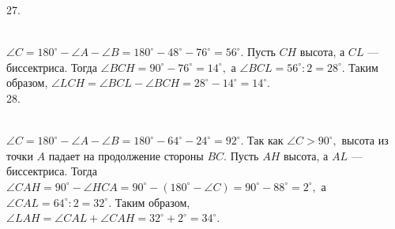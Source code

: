 \documentclass[12pt]{article}
\begin{document}
27. \begin{figure}[ht!]
\end{figure}\\
$\angle C=180^\circ-\angle A-\angle B=180^\circ-48^\circ-76^\circ=56^\circ.$ Пусть $CH$ высота, а $CL$ --- биссектриса. Тогда $\angle BCH=90^\circ-76^\circ=14^\circ,$ а $\angle BCL=56^\circ:2=28^\circ.$ Таким образом, $\angle LCH=\angle BCL- \angle BCH=28^\circ-14^\circ=14^\circ.$\\
28. \begin{figure}[ht!]
\end{figure}\\
$\angle C=180^\circ-\angle A-\angle B=180^\circ-64^\circ-24^\circ=92^\circ.$ Так как $\angle C>90^\circ,$ высота из точки $A$ падает на продолжение стороны $BC.$   Пусть $AH$ высота, а $AL$ --- биссектриса. Тогда $\angle CAH=90^\circ-\angle HCA=90^\circ-(180^\circ-\angle C)=90^\circ-88^\circ=2^\circ,$ а $\angle CAL=64^\circ:2=32^\circ.$ Таким образом, $\angle LAH=\angle CAL+ \angle CAH=32^\circ+2^\circ=34^\circ.$\newpage\noindent
\end{document}
